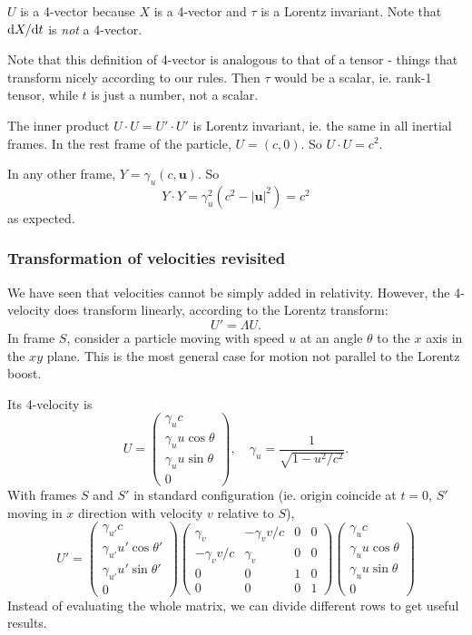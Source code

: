 \documentclass[a4paper]{article}
\begin{document}
$U$ is a 4-vector because $X$ is a 4-vector and $\tau$ is a Lorentz invariant. Note that $\mathrm{d} X/\mathrm{d} t$ is \emph{not} a 4-vector.

Note that this definition of 4-vector is analogous to that of a tensor - things that transform nicely according to our rules. Then $\tau$ would be a scalar, ie. rank-1 tensor, while $t$ is just a number, not a scalar.

The inner product $U\cdot U = U' \cdot U'$ is Lorentz invariant, ie. the same in all inertial frames. In the rest frame of the particle, $U = (c, 0)$. So $U\cdot U = c^2$.

In any other frame, $Y = \gamma_u(c, \mathbf{u})$. So
\[
  Y\cdot Y = \gamma_u^2 (c^2 - |\mathbf{u}|^2) = c^2
\]
as expected.

\subsubsection*{Transformation of velocities revisited}
We have seen that velocities cannot be simply added in relativity. However, the 4-velocity does transform linearly, according to the Lorentz transform:
\[
  U' = \Lambda U.
\]
In frame $S$, consider a particle moving with speed $u$ at an angle $\theta$ to the $x$ axis in the $xy$ plane. This is the most general case for motion not parallel to the Lorentz boost.

Its 4-velocity is
\[
  U = 
  \begin{pmatrix}
    \gamma_u c\\
    \gamma_u u\cos \theta\\
    \gamma_u u\sin \theta\\
    0
  \end{pmatrix}, \quad \gamma_u = \frac{1}{\sqrt{1 - u^2/c^2}}.
\]
With frames $S$ and $S'$ in standard configuration (ie. origin coincide at $t = 0$, $S'$ moving in $x$ direction with velocity $v$ relative to $S$),
\[
  U' = \begin{pmatrix}
    \gamma_{u'} c\\
    \gamma_{u'} u'\cos \theta'\\
    \gamma_{u'} u'\sin \theta'\\
    0
  \end{pmatrix}
  \begin{pmatrix}
    \gamma_v & -\gamma_v v/c & 0 & 0\\
    -\gamma_{v} v/c & \gamma_v & 0 & 0\\
    0 & 0 & 1 & 0\\
    0 & 0 & 0 & 1
  \end{pmatrix}
  \begin{pmatrix}
    \gamma_u c\\
    \gamma_u u\cos \theta\\
    \gamma_u u\sin \theta\\
    0
  \end{pmatrix}
\]
Instead of evaluating the whole matrix, we can divide different rows to get useful results.
\end{document}

